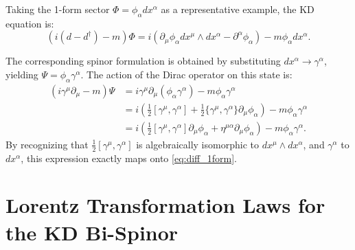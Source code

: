 Taking the 1-form sector $\Phi=\phi_\alpha dx^\alpha$ as a representative example, the KD equation is: 
\begin{equation}\label{eq:diff_1form}
    (i(d - d^\dagger) - m)\Phi =i(\partial_\mu \phi_\alpha dx^\mu\wedge dx^\alpha-\partial^\alpha \phi_\alpha)-m\phi_\alpha dx^\alpha.
\end{equation}

The corresponding spinor formulation is obtained by substituting $dx^\alpha \to \gamma^\alpha$, yielding $\Psi=\phi_\alpha \gamma^\alpha$. The action of the Dirac operator on this state is: 
\begin{equation}
\begin{aligned}
    (i\gamma^\mu\partial_\mu -m)\Psi&=i\gamma^\mu\partial_\mu(\phi_\alpha \gamma^\alpha)-m\phi_\alpha \gamma^\alpha\\
    &=i(\frac{1}{2}[\gamma^\mu,\gamma^\alpha]+\frac{1}{2}\{\gamma^\mu,\gamma^\alpha\}\partial_\mu\phi_\alpha)-m\phi_\alpha \gamma^\alpha\\
    &=i(\frac{1}{2}[\gamma^\mu,\gamma^\alpha]\partial_\mu\phi_\alpha+\eta^{\mu\alpha}\partial_\mu\phi_\alpha)-m\phi_\alpha \gamma^\alpha.
\end{aligned}
\end{equation}
By recognizing that $\frac{1}{2}[\gamma^\mu,\gamma^\alpha]$ is algebraically isomorphic to $dx^\mu\wedge dx^\alpha$, and $\gamma^\alpha$ to $dx^\alpha$, this expression exactly maps onto \cref{eq:diff_1form}.


\section{Lorentz Transformation Laws for the KD Bi-Spinor}\label{sec:Lorentz_transform}


